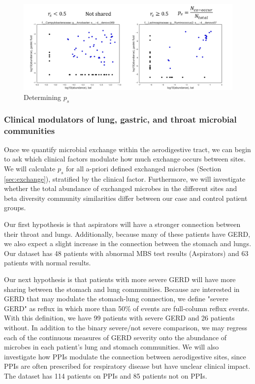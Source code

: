 \documentclass[12pt]{article}
\begin{document}
\begin{figure}
	\centering
    \includegraphics[scale=0.5]{sharedness_definition}
    \caption{Determining $p_s$}\label{fig:sharedness_defn}
\end{figure}


\subsubsection{Clinical modulators of lung, gastric, and throat microbial communities}
Once we quantify microbial exchange within the aerodigestive tract, we can begin to ask which clinical factors modulate how much exchange occurs between sites. We will calculate $p_s$ for all a-priori defined exchanged microbes (Section \ref{sec:exchange}), stratified by the clinical factor. Furthermore, we will investigate whether the total abundance of exchanged microbes in the different sites and beta diversity community similarities differ between our case and control patient groups.

Our first hypothesis is that aspirators will have a stronger connection between their throat and lungs. Additionally, because many of these patients have GERD, we also expect a slight increase in the connection between the stomach and lungs. Our dataset has 48 patients with abnormal MBS test results (Aspirators) and 63 patients with normal results.

Our next hypothesis is that patients with more severe GERD will have more sharing between the stomach and lung communities. Because are interested in GERD that may modulate the stomach-lung connection, we define "severe GERD" as reflux in which more than 50\% of events are full-column reflux events. With this definition, we have 99 patients with severe GERD and 26 patients without. In addition to the binary severe/not severe comparison, we may regress each of the continuous measures of GERD severity onto the abundance of microbes in each patient's lung and stomach communities. We will also investigate how PPIs modulate the connection between aerodigestive sites, since PPIs are often prescribed for respiratory disease but have unclear clinical impact. The dataset has 114 patients on PPIs and 85 patients not on PPIs.
\end{document}
